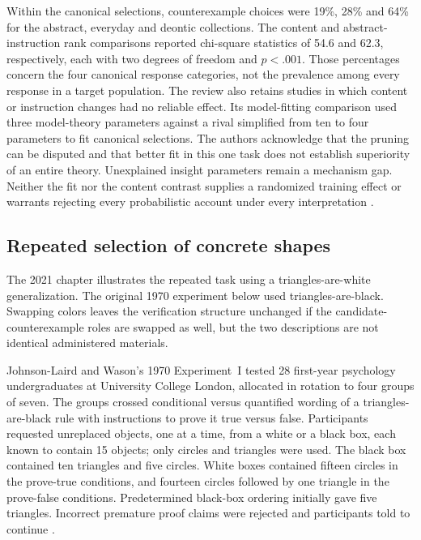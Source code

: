 Within the canonical selections, counterexample choices were 19\%,
28\% and 64\% for the abstract, everyday and deontic collections.
The content and abstract-instruction rank comparisons reported
chi-square statistics of 54.6 and 62.3, respectively, each with two
degrees of freedom and \(p<.001\).
Those percentages concern the four canonical response categories,
not the prevalence among every response in a target population.
The review also retains studies in which content or instruction
changes had no reliable effect. Its model-fitting comparison used
three model-theory parameters against a rival simplified from ten
to four parameters to fit canonical selections. The authors acknowledge
that the pruning can be disputed and that better fit in this one task
does not establish superiority of an entire theory. Unexplained insight
parameters remain a mechanism gap. Neither the fit nor the content
contrast supplies a randomized training effect or warrants rejecting
every probabilistic account under every interpretation
\cite[pp.~785--786,789--792, Tables~4,6]{RagniKolaJohnsonLaird2018Selection}.

\subsection{Repeated selection of concrete shapes}

The 2021 chapter illustrates the repeated task using a triangles-are-white
generalization. The original 1970 experiment below used triangles-are-black.
Swapping colors leaves the verification structure unchanged if the
candidate-counterexample roles are swapped as well, but the two
descriptions are not identical administered materials.

Johnson-Laird and Wason's 1970 Experiment~I tested 28 first-year psychology
undergraduates at University College London, allocated in rotation to
four groups of seven. The groups crossed conditional versus quantified
wording of a triangles-are-black rule with instructions to prove it true
versus false. Participants requested unreplaced objects, one at a time,
from a white or a black box, each known to contain 15 objects; only circles
and triangles were used. The black box contained ten triangles and five
circles. White boxes contained fifteen circles in the prove-true
conditions, and fourteen circles followed by one triangle in the
prove-false conditions. Predetermined black-box ordering initially gave
five triangles. Incorrect premature proof claims were rejected and
participants told to continue \cite[pp.~50--53]{JohnsonLairdWason1970Insight}.


